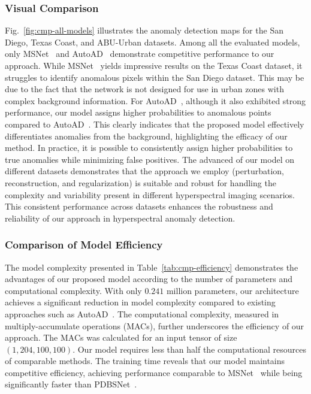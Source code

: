 \subsubsection{Visual Comparison}
Fig.~\ref{fig:cmp-all-models} illustrates the anomaly detection maps for the San Diego, Texas Coast, and ABU-Urban datasets. Among all the evaluated models, only MSNet~\cite{MSNet} and AutoAD~\cite{AutoAD} demonstrate competitive performance to our approach. While MSNet~\cite{MSNet} yields impressive results on the Texas Coast dataset, it struggles to identify anomalous pixels within the San Diego dataset. This may be due to the fact that the network is not designed for use in urban zones with complex background information. For AutoAD~\cite{AutoAD}, although it also exhibited strong performance, our model assigns higher probabilities to anomalous points compared to AutoAD~\cite{AutoAD}. This clearly indicates that the proposed model effectively differentiates anomalies from the background, highlighting the efficacy of our method. In practice, it is possible to consistently assign higher probabilities to true anomalies while minimizing false positives. The advanced of our model on different datasets demonstrates that the approach we employ (perturbation, reconstruction, and regularization) is suitable and robust for handling the complexity and variability present in different hyperspectral imaging scenarios. This consistent performance across datasets enhances the robustness and reliability of our approach in hyperspectral anomaly detection.



\subsubsection{Comparison of Model Efficiency}
The model complexity presented in Table~\ref{tab:cmp-efficiency} demonstrates the advantages of our proposed model according to the number of parameters and computational complexity. With only $0.241$ million parameters, our architecture achieves a significant reduction in model complexity compared to existing approaches such as AutoAD~\cite{AutoAD}. The computational complexity, measured in multiply-accumulate operations (MACs), further underscores the efficiency of our approach. The MACs was calculated for an input tensor of size $(1, 204, 100, 100)$. Our model requires less than half the computational resources of comparable methods. The training time reveals that our model maintains competitive efficiency, achieving performance comparable to MSNet~\cite{MSNet} while being significantly faster than PDBSNet~\cite{PDBSNet}.





